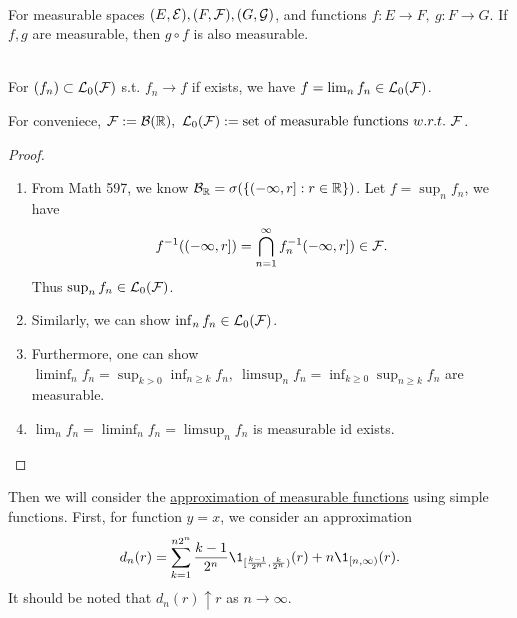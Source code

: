 \begin{proposition}\label{1.10}\ \\
For measurable spaces $(E,\mathcal{E}), (F,\mathcal{F}),(G,\mathcal{G})$, and functions $f: E \to F,\ g: F \to G$. If $f,g$ are measurable, then $g \circ f$ is also measurable.
\end{proposition}

\begin{theorem}\ \\
For $(f_n) \subset \mathcal{L}_0(\mathcal{F})$ s.t. $f_n \to f$ if exists, we have $f = \lim_n f_n \in \mathcal{L}_0(\mathcal{F})$. 
\end{theorem}
\begin{remark}
For conveniece, $\Fs := \Bs(\R),\ \Ls_0(\Fs) := \text{set of measurable functions}\ w.r.t.\ \Fs$.
\end{remark}

\begin{proof}
\begin{enumerate}
    \item From Math 597, we know $\mathcal{B}_{\mathbb{R}} = \sigma(\{(-\infty,r]: r \in \mathbb{R}\})$. Let $f = \sup_{n} f_n$, we have $$f^{-1}((-\infty,r]) = \bigcap_{n=1}^\infty f_n^{-1}(-\infty, r]) \in \mathcal{F}.$$
    Thus $\sup_n f_n \in \mathcal{L}_0(\mathcal{F})$.
    \item Similarly, we can show $\inf_n f_n \in \mathcal{L}_0(\mathcal{F})$.
    \item Furthermore, one can show $\liminf_n{f_n} = \sup_{k > 0} \inf_{n \geq k} f_n,\ \limsup_n{f_n} = \inf_{k \geq 0} \sup_{n \geq k} f_n$ are measurable.
    \item $\lim_n f_n = \liminf_n{f_n} = \limsup_n{f_n}$ is measurable id exists.
\end{enumerate}
\end{proof}

\np Then we will consider the \underline{approximation of measurable functions} using simple functions. First, for function $y = x$, we consider an approximation 
$$d_n(r) = \sum_{k=1}^{n 2^n} \frac{k-1}{2^n} \1_{[\frac{k-1}{2^n} , \frac{k}{2^n})} (r) + n \1_{[n,\infty)} (r).$$
It should be noted that $d_n(r) \uparrow r$ as $n \to \infty$.


